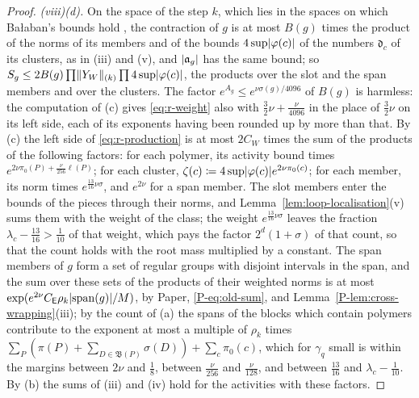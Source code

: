 \documentclass[11pt]{preprint}
\DeclarePairedDelimiter{\abs}{\lvert}{\rvert}
\DeclarePairedDelimiter{\norm}{\lVert}{\rVert}
\numberwithin{equation}{section}
\theoremstyle{definition}
\theoremstyle{remark}
\theoremstyle{plain}
\begin{document}
\begin{proof}
\emph{(viii)(d).} On the space of the step $k$, which lies in the spaces on which Ba{\l}aban's bounds hold \cite[(1.73)--(1.75), p.~380]{BalabanLFR2}, the contraction of $g$ is at most $B(g)$ times the product of the norms of its members and of the bounds $4\sup\abs{\varphi(c)}$ of the numbers $\mathfrak d_c$ of its clusters, as in (iii) and (v), and $\abs{\mathfrak a_g}$ has the same bound; so $S_g \leq 2B(g)\prod\norm{Y_W}_{(k)}\prod4\sup\abs{\varphi(c)}$, the products over the slot and the span members and over the clusters. The factor $e^{A_g} \leq e^{\nu\sigma(g)/4096}$ of $B(g)$ is harmless: the computation of (c) gives \eqref{eq:r-weight} also with $\frac32\nu + \frac{\nu}{4096}$ in the place of $\frac32\nu$ on its left side, each of its exponents having been rounded up by more than that. By (c) the left side of \eqref{eq:r-production} is at most $2C_W$ times the sum of the products of the following factors: for each polymer, its activity bound times $e^{2\nu\pi_0(P) + \frac{\nu}{256}\ell(P)}$; for each cluster, $\zeta(c) \coloneqq 4\sup\abs{\varphi(c)}e^{2\nu\pi_0(c)}$; for each member, its norm times $e^{\frac{13}{16}\nu\sigma}$, and $e^{2\nu}$ for a span member. The slot members enter the bounds of the pieces through their norms, and Lemma~\ref{lem:loop-localisation}(v) sums them with the weight of the class; the weight $e^{\frac{13}{16}\nu\sigma}$ leaves the fraction $\lambda_c - \frac{13}{16} > \frac{1}{10}$ of that weight, which pays the factor $2^d(1 + \sigma)$ of that count, so that the count holds with the root mass multiplied by a constant. The span members of $g$ form a set of regular groups with disjoint intervals in the span, and the sum over these sets of the products of their weighted norms is at most $\exp(e^{2\nu}C_{\mathsf E}\rho_k\abs{\mathrm{span}(g)}/M)$, by Paper, \eqref{P-eq:old-sum}, and Lemma~\ref{P-lem:cross-wrapping}(iii); by the count of (a) the spans of the blocks which contain polymers contribute to the exponent at most a multiple of $\rho_k$ times $\sum_P(\pi(P) + \sum_{D \in \mathfrak B(P)}\sigma(D)) + \sum_c\pi_0(c)$, which for $\gamma_q$ small is within the margins between $2\nu$ and $\frac18$, between $\frac{\nu}{256}$ and $\frac{\nu}{128}$, and between $\frac{13}{16}$ and $\lambda_c - \frac{1}{10}$. By (b) the sums of (iii) and (iv) hold for the activities with these factors.


\end{proof}
\end{document}
